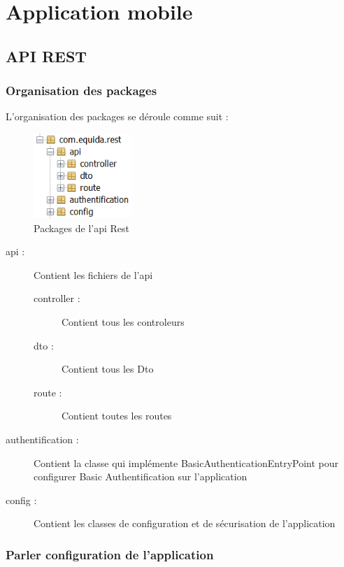 \chapter{Application mobile}

	\section{API REST}

		\subsection{Organisation des packages}

			L'organisation des packages se déroule comme suit :

			\begin{figure}[H]
				\centering\includegraphics[width=0.33\textwidth, keepaspectratio]{res/package.png}
				\caption{Packages de l'api Rest}
			\end{figure}

			\begin{description}
				\item[api :]{Contient les fichiers de l'api}
				\begin{description}
					\item[controller :]{Contient tous les controleurs}
					\item[dto :]{Contient tous les Dto}
					\item[route :]{Contient toutes les routes}
				\end{description}
				\item[authentification :]{Contient la classe qui implémente BasicAuthenticationEntryPoint pour configurer Basic Authentification sur l'application}
				\item[config :]{Contient les classes de configuration et de sécurisation de l'application}
			\end{description}

		\subsection{Parler configuration de l'application}

